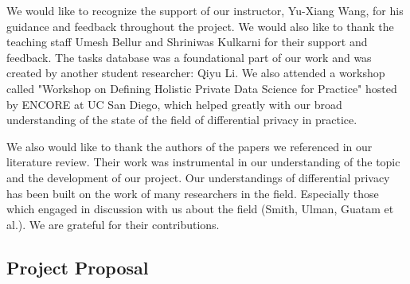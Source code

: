 \documentclass[12pt,letterpaper]{article}
\begin{document}
We would like to recognize the support of our instructor, Yu-Xiang Wang, for his guidance and feedback throughout the project. We would also like to thank the teaching staff Umesh Bellur and Shriniwas Kulkarni for their support and feedback. The tasks database was a foundational part of our work and was created by another student researcher: Qiyu Li. We also attended a workshop called "Workshop on Defining Holistic Private Data Science for Practice" hosted by ENCORE at UC San Diego, which helped greatly with our broad understanding of the state of the field of differential privacy in practice.

We also would like to thank the authors of the papers we referenced in our literature review. Their work was instrumental in our understanding of the topic and the development of our project. Our understandings of differential privacy has been built on the work of many researchers in the field. Especially those which engaged in discussion with us about the field (Smith, Ulman, Guatam et al.). We are grateful for their contributions.

%

\makereference








\clearpage
\makeappendix

\subsection{Project Proposal}


% 
\end{document}

